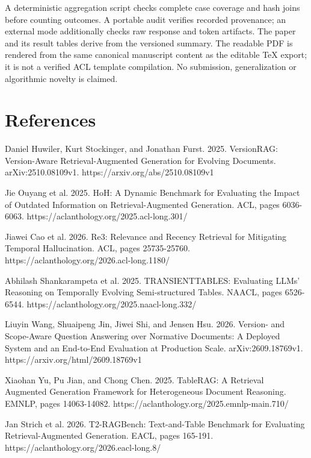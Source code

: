 \documentclass[11pt]{article}
\begin{document}
A deterministic aggregation script checks complete case coverage and hash joins before counting outcomes. A portable audit verifies recorded provenance; an external mode additionally checks raw response and token artifacts. The paper and its result tables derive from the versioned summary. The readable PDF is rendered from the same canonical manuscript content as the editable TeX export; it is not a verified ACL template compilation. No submission, generalization or algorithmic novelty is claimed.

\clearpage
\section*{References}
\begin{sloppypar}
\noindent Daniel Huwiler, Kurt Stockinger, and Jonathan Furst. 2025. VersionRAG: Version-Aware Retrieval-Augmented Generation for Evolving Documents. arXiv:2510.08109v1. https://arxiv.org/abs/2510.08109v1\par\medskip
\noindent Jie Ouyang et al. 2025. HoH: A Dynamic Benchmark for Evaluating the Impact of Outdated Information on Retrieval-Augmented Generation. ACL, pages 6036-6063. https://aclanthology.org/2025.acl-long.301/\par\medskip
\noindent Jiawei Cao et al. 2026. Re3: Relevance and Recency Retrieval for Mitigating Temporal Hallucination. ACL, pages 25735-25760. https://aclanthology.org/2026.acl-long.1180/\par\medskip
\noindent Abhilash Shankarampeta et al. 2025. TRANSIENTTABLES: Evaluating LLMs' Reasoning on Temporally Evolving Semi-structured Tables. NAACL, pages 6526-6544. https://aclanthology.org/2025.naacl-long.332/\par\medskip
\noindent Liuyin Wang, Shuaipeng Jin, Jiwei Shi, and Jensen Hsu. 2026. Version- and Scope-Aware Question Answering over Normative Documents: A Deployed System and an End-to-End Evaluation at Production Scale. arXiv:2609.18769v1. https://arxiv.org/html/2609.18769v1\par\medskip
\noindent Xiaohan Yu, Pu Jian, and Chong Chen. 2025. TableRAG: A Retrieval Augmented Generation Framework for Heterogeneous Document Reasoning. EMNLP, pages 14063-14082. https://aclanthology.org/2025.emnlp-main.710/\par\medskip
\noindent Jan Strich et al. 2026. T2-RAGBench: Text-and-Table Benchmark for Evaluating Retrieval-Augmented Generation. EACL, pages 165-191. https://aclanthology.org/2026.eacl-long.8/\par\medskip

\end{sloppypar}
\end{document}
